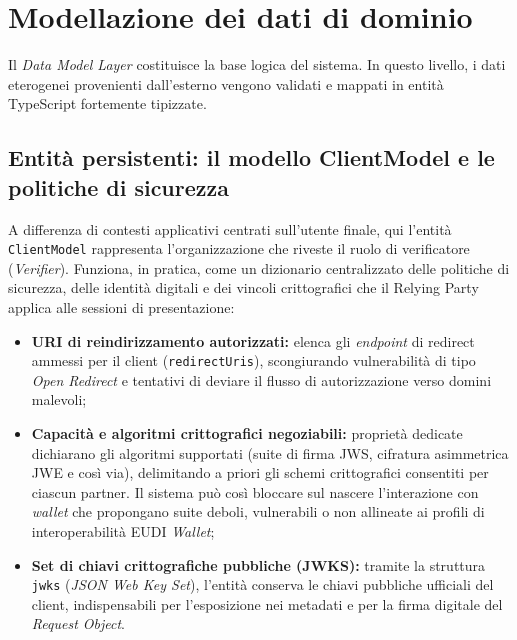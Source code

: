\section{Modellazione dei dati di dominio}
\label{sec:modellazione_dati}
Il \textit{Data Model Layer} costituisce la base logica del sistema. In questo livello, i dati eterogenei provenienti dall'esterno vengono validati e mappati in entità TypeScript fortemente tipizzate.

\subsection{Entità persistenti: il modello ClientModel e le politiche di sicurezza}
A differenza di contesti applicativi centrati sull'utente finale, qui l'entità \texttt{ClientModel} rappresenta l'organizzazione che riveste il ruolo di verificatore (\textit{Verifier}). Funziona, in pratica, come un dizionario centralizzato delle politiche di sicurezza, delle identità digitali e dei vincoli crittografici che il Relying Party applica alle sessioni di presentazione:
\begin{itemize}
    \item \textbf{URI di reindirizzamento autorizzati:} elenca gli \textit{endpoint} di redirect ammessi per il client (\texttt{redirectUris}), scongiurando vulnerabilità di tipo \textit{Open Redirect} e tentativi di deviare il flusso di autorizzazione verso domini malevoli;
    \item \textbf{Capacità e algoritmi crittografici negoziabili:} proprietà dedicate dichiarano gli algoritmi supportati (suite di firma JWS, cifratura asimmetrica JWE e così via), delimitando a priori gli schemi crittografici consentiti per ciascun partner. Il sistema può così bloccare sul nascere l'interazione con \textit{wallet} che propongano suite deboli, vulnerabili o non allineate ai profili di interoperabilità EUDI \textit{Wallet};
    \item \textbf{Set di chiavi crittografiche pubbliche (JWKS):} tramite la struttura \texttt{jwks} (\textit{JSON Web Key Set}), l'entità conserva le chiavi pubbliche ufficiali del client, indispensabili per l'esposizione nei metadati e per la firma digitale del \textit{Request Object}.
\end{itemize}

